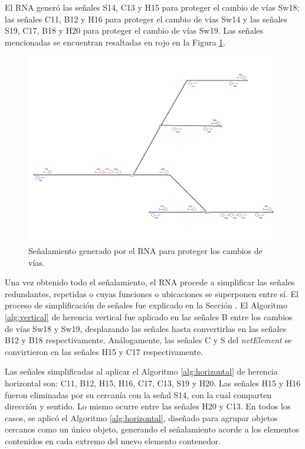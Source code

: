 	El RNA generó las señales S14, C13 y H15 para proteger el cambio de vías Sw18; las señales C11, B12 y H16 para proteger el cambio de vías Sw14 y las señales S19, C17, B18 y H20 para proteger el cambio de vías Sw19. Las señales mencionadas se encuentran resaltadas en rojo en la Figura \ref{fig:EJ7_6}.
	
	\begin{figure}[H]
		\centering
		\includegraphics[width=1\textwidth]{resultados-obtenidos/ejemplo7/images/7_step4.png}
		\centering\caption{Señalamiento generado por el RNA para proteger los cambios de vías.}
		\label{fig:EJ7_6}
	\end{figure}
	
	Una vez obtenido todo el señalamiento, el RNA procede a simplificar las señales redundantes, repetidas o cuyas funciones o ubicaciones se superponen entre sí. El proceso de simplificación de señales fue explicado en la Sección \label{sec:simplificacion}. El Algoritmo \ref{alg:vertical} de herencia vertical fue aplicado en las señales B entre los cambios de vías Sw18 y Sw19, desplazando las señales hasta convertirlas en las señales B12 y B18 respectivamente. Análogamente, las señales C y S del \textit{netElement} se convirtieron en las señales H15 y C17 respectivamente.
	
	Las señales simplificadas al aplicar el Algoritmo \ref{alg:horizontal} de herencia horizontal son: C11, B12, H15, H16, C17, C13, S19 y H20. Las señales H15 y H16 fueron eliminadas por su cercanía con la señal S14, con la cual comparten dirección y sentido. Lo mismo ocurre entre las señales H20 y C13. En todos los casos, se aplicó el Algoritmo \ref{alg:horizontal}, diseñado para agrupar objetos cercanos como un único objeto, generando el señalamiento acorde a los elementos contenidos en cada extremo del nuevo elemento contenedor.
	
